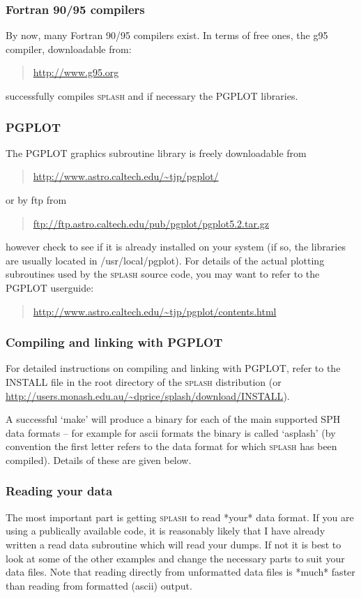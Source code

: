 \documentclass[a4paper,10pt]{article}
\newcommand{\splash}{\textsc{splash }}
\begin{document}
\subsubsection{ Fortran 90/95 compilers}
 By now, many Fortran 90/95 compilers exist. In terms of free ones, the g95 compiler, downloadable from:
\begin{quote}
\url{http://www.g95.org}
\end{quote}
successfully compiles \splash and if necessary the PGPLOT libraries.

\subsubsection{ PGPLOT}
 The PGPLOT graphics subroutine library is freely downloadable from
\begin{quote}
\url{http://www.astro.caltech.edu/~tjp/pgplot/}
\end{quote}
or by ftp from
\begin{quote}
\url{ftp://ftp.astro.caltech.edu/pub/pgplot/pgplot5.2.tar.gz}
\end{quote}
however check to see if it is already installed on your system (if so, the libraries are
usually located in /usr/local/pgplot). For details of the actual plotting subroutines
used by the \splash source code, you may want to refer to the PGPLOT userguide:
\begin{quote}
\url{http://www.astro.caltech.edu/~tjp/pgplot/contents.html}
\end{quote}

\subsubsection{ Compiling and linking with PGPLOT}
For detailed instructions on compiling and linking with PGPLOT, refer to the INSTALL file in the root directory of the \splash distribution (or \url{http://users.monash.edu.au/~dprice/splash/download/INSTALL}).

A successful `make' will produce a binary for each of the main supported SPH data formats -- for example for ascii formats the binary is called `asplash' (by convention the first letter refers to the data format for which \splash has been compiled). Details of these are given below.

\subsubsection{ Reading your data}
 The most important part is getting \splash to read *your* data format.
If you are using a publically available code, it is reasonably likely that I
have already written a read data subroutine which will read your dumps.
If not it is best to look at some of the other examples and change the 
necessary parts to suit your data files. Note that reading directly from
unformatted data files is *much* faster than reading from formatted (ascii)
output.   
\end{document}
